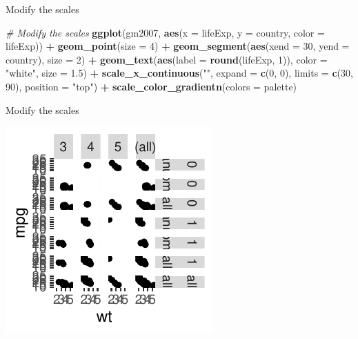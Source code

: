 \documentclass[
  ignorenonframetext,
]{beamer}
\newenvironment{Shaded}{\begin{snugshade}}{\end{snugshade}}
\newcommand{\AttributeTok}[1]{\textcolor[rgb]{0.13,0.29,0.53}{#1}}
\newcommand{\CommentTok}[1]{\textcolor[rgb]{0.56,0.35,0.01}{\textit{#1}}}
\newcommand{\DecValTok}[1]{\textcolor[rgb]{0.00,0.00,0.81}{#1}}
\newcommand{\FloatTok}[1]{\textcolor[rgb]{0.00,0.00,0.81}{#1}}
\newcommand{\FunctionTok}[1]{\textcolor[rgb]{0.13,0.29,0.53}{\textbf{#1}}}
\newcommand{\NormalTok}[1]{#1}
\newcommand{\SpecialCharTok}[1]{\textcolor[rgb]{0.81,0.36,0.00}{\textbf{#1}}}
\newcommand{\StringTok}[1]{\textcolor[rgb]{0.31,0.60,0.02}{#1}}
\begin{document}
\begin{frame}[fragile]{Modify the scales}
\label{modify-the-scales}

\begin{Shaded}
\begin{Highlighting}[]
\CommentTok{\# Modify the scales}
\FunctionTok{ggplot}\NormalTok{(gm2007, }\FunctionTok{aes}\NormalTok{(}\AttributeTok{x =}\NormalTok{ lifeExp, }\AttributeTok{y =}\NormalTok{ country, }\AttributeTok{color =}\NormalTok{ lifeExp)) }\SpecialCharTok{+}
    \FunctionTok{geom\_point}\NormalTok{(}\AttributeTok{size =} \DecValTok{4}\NormalTok{) }\SpecialCharTok{+} \FunctionTok{geom\_segment}\NormalTok{(}\FunctionTok{aes}\NormalTok{(}\AttributeTok{xend =} \DecValTok{30}\NormalTok{, }\AttributeTok{yend =}\NormalTok{ country),}
    \AttributeTok{size =} \DecValTok{2}\NormalTok{) }\SpecialCharTok{+} \FunctionTok{geom\_text}\NormalTok{(}\FunctionTok{aes}\NormalTok{(}\AttributeTok{label =} \FunctionTok{round}\NormalTok{(lifeExp, }\DecValTok{1}\NormalTok{)), }\AttributeTok{color =} \StringTok{"white"}\NormalTok{,}
    \AttributeTok{size =} \FloatTok{1.5}\NormalTok{) }\SpecialCharTok{+} \FunctionTok{scale\_x\_continuous}\NormalTok{(}\StringTok{""}\NormalTok{, }\AttributeTok{expand =} \FunctionTok{c}\NormalTok{(}\DecValTok{0}\NormalTok{, }\DecValTok{0}\NormalTok{), }\AttributeTok{limits =} \FunctionTok{c}\NormalTok{(}\DecValTok{30}\NormalTok{,}
    \DecValTok{90}\NormalTok{), }\AttributeTok{position =} \StringTok{"top"}\NormalTok{) }\SpecialCharTok{+} \FunctionTok{scale\_color\_gradientn}\NormalTok{(}\AttributeTok{colors =}\NormalTok{ palette)}
\end{Highlighting}
\end{Shaded}
\end{frame}

\begin{frame}{Modify the scales}
\label{modify-the-scales-1}

\begin{center}\includegraphics[width=0.5\linewidth]{Figs/unnamed-chunk-99-1} \end{center}
\end{frame}
\end{document}
